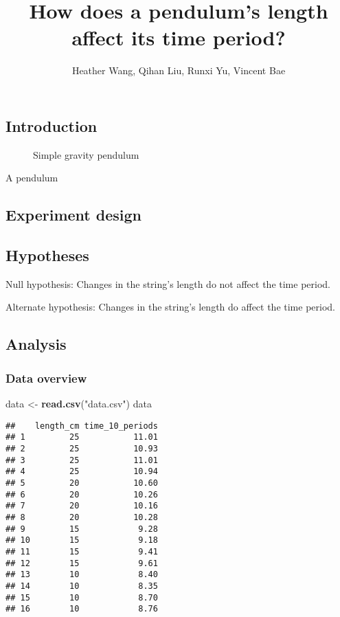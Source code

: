 \documentclass[
]{article}
\title{How does a pendulum's length affect its time period?}
\author{Heather Wang, Qihan Liu, Runxi Yu, Vincent Bae}
\date{}
\newenvironment{Shaded}{\begin{snugshade}}{\end{snugshade}}
\newcommand{\FunctionTok}[1]{\textcolor[rgb]{0.13,0.29,0.53}{\textbf{#1}}}
\newcommand{\NormalTok}[1]{#1}
\newcommand{\OtherTok}[1]{\textcolor[rgb]{0.56,0.35,0.01}{#1}}
\newcommand{\StringTok}[1]{\textcolor[rgb]{0.31,0.60,0.02}{#1}}
\begin{document}
\maketitle

\subsection{Introduction}\label{introduction}

\begin{figure}
\centering

\caption{Simple gravity pendulum}
\end{figure}

A pendulum

\subsection{Experiment design}\label{experiment-design}

\subsection{Hypotheses}\label{hypotheses}

Null hypothesis: Changes in the string's length do not affect the time
period.

Alternate hypothesis: Changes in the string's length do affect the time
period.

\subsection{Analysis}\label{analysis}

\subsubsection{Data overview}\label{data-overview}

\begin{Shaded}
\begin{Highlighting}[]
\NormalTok{data }\OtherTok{\textless{}{-}} \FunctionTok{read.csv}\NormalTok{(}\StringTok{"data.csv"}\NormalTok{)}
\NormalTok{data}
\end{Highlighting}
\end{Shaded}

\begin{verbatim}
##    length_cm time_10_periods
## 1         25           11.01
## 2         25           10.93
## 3         25           11.01
## 4         25           10.94
## 5         20           10.60
## 6         20           10.26
## 7         20           10.16
## 8         20           10.28
## 9         15            9.28
## 10        15            9.18
## 11        15            9.41
## 12        15            9.61
## 13        10            8.40
## 14        10            8.35
## 15        10            8.70
## 16        10            8.76
\end{verbatim}
\end{document}

